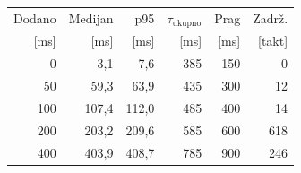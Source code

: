 \begin{tabular}{rrrrrr}
\hline
\small Dodano & \small Medijan & \small p95 & \small $\tau_\text{ukupno}$ & \small Prag & \small Zadrž. \\
\small [ms] & \small [ms] & \small [ms] & \small [ms] & \small [ms] & \small [takt] \\
\hline
0 & 3,1 & 7,6 & 385 & 150 & 0 \\
50 & 59,3 & 63,9 & 435 & 300 & 12 \\
100 & 107,4 & 112,0 & 485 & 400 & 14 \\
200 & 203,2 & 209,6 & 585 & 600 & 618 \\
400 & 403,9 & 408,7 & 785 & 900 & 246 \\
\hline
\end{tabular}
